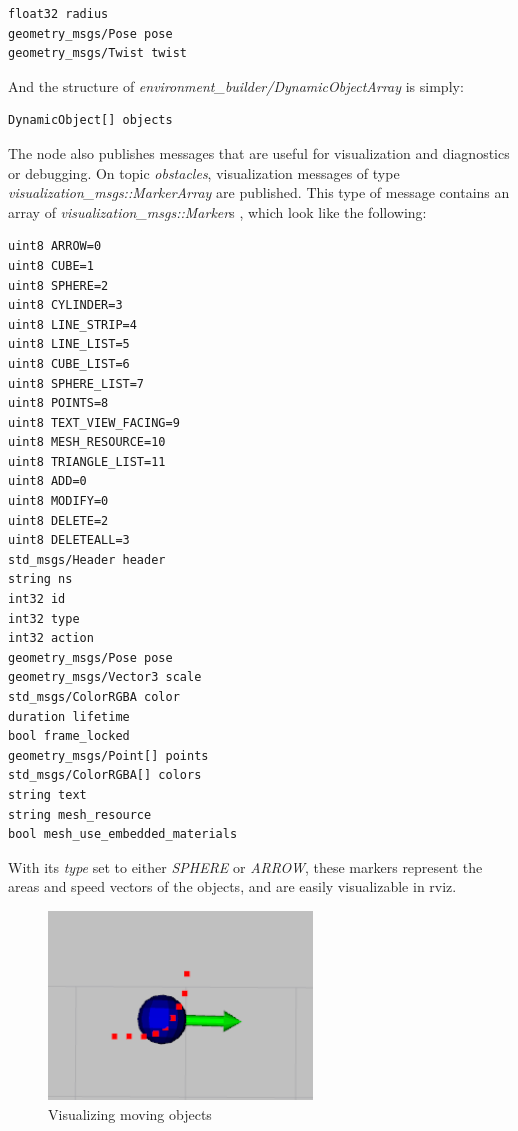 \begin{minipage}{\textwidth}
\begin{lstlisting}[language=IDL]
float32 radius
geometry_msgs/Pose pose
geometry_msgs/Twist twist
\end{lstlisting}
\end{minipage}

And the structure of \textit{environment\_builder/DynamicObjectArray} is simply:

\begin{lstlisting}[language=IDL]
DynamicObject[] objects
\end{lstlisting}

The node also publishes messages that are useful for visualization and diagnostics or debugging. On topic \textit{obstacles}, visualization messages of type \textit{visualization\_msgs::MarkerArray} \cite{ros_msg_MarkerArray} are published. This type of message contains an array of \textit{visualization\_msgs::Marker}s \cite{ros_msg_Marker}, which look like the following:

\begin{minipage}{\textwidth}
\begin{lstlisting}[language=IDL]
uint8 ARROW=0
uint8 CUBE=1
uint8 SPHERE=2
uint8 CYLINDER=3
uint8 LINE_STRIP=4
uint8 LINE_LIST=5
uint8 CUBE_LIST=6
uint8 SPHERE_LIST=7
uint8 POINTS=8
uint8 TEXT_VIEW_FACING=9
uint8 MESH_RESOURCE=10
uint8 TRIANGLE_LIST=11
uint8 ADD=0
uint8 MODIFY=0
uint8 DELETE=2
uint8 DELETEALL=3
std_msgs/Header header
string ns
int32 id
int32 type
int32 action
geometry_msgs/Pose pose
geometry_msgs/Vector3 scale
std_msgs/ColorRGBA color
duration lifetime
bool frame_locked
geometry_msgs/Point[] points
std_msgs/ColorRGBA[] colors
string text
string mesh_resource
bool mesh_use_embedded_materials
\end{lstlisting}
\end{minipage}

With its \textit{type} set to either \textit{SPHERE} or \textit{ARROW}, these markers represent the areas and speed vectors of the objects, and are easily visualizable in rviz.

\begin{figure}[!ht]
    \centering
    \includegraphics[height=50mm]{figures/raw/rviz_moving_object.png}
    \caption{Visualizing moving objects}
    \label{rviz_moving_object}
\end{figure}

